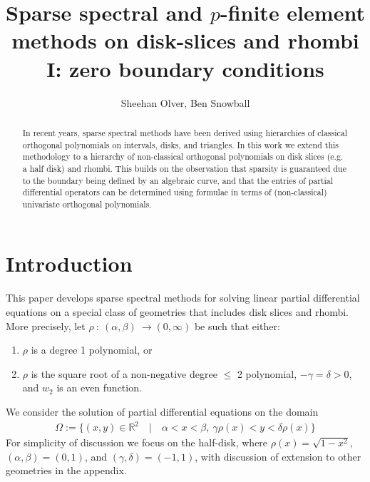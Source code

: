 \documentclass[11pt, oneside]{article}   	%
\title{Sparse spectral and $p$-finite element methods on disk-slices and rhombi I: zero boundary conditions}
\author{Sheehan Olver, Ben Snowball}
\newcommand{\R}{\mathbb{R}}
\begin{document}
\maketitle

\begin{abstract}
In recent years, sparse spectral methods have been derived using hierarchies of classical orthogonal polynomials on intervals, disks, and triangles. In this work we extend this methodology to a hierarchy of non-classical orthogonal polynomials on disk slices (e.g. a half disk) and rhombi. This builds on the observation that sparsity is guaranteed due to the boundary being defined by an algebraic curve, and that the entries of partial differential operators can be determined using formulae in terms of (non-classical) univariate orthogonal polynomials. 
\end{abstract}


%
\section{Introduction}

This paper develops sparse spectral methods for solving linear partial differential equations on a special class of geometries that includes disk slices and rhombi.  
More precisely, let  \(\rho \: : \: (\alpha,\beta) \: \to (0,\infty)\) be such that either:

\begin{enumerate}
\item  \(\rho\) is a degree 1 polynomial, or 
\item \(\rho\) is the square root of a non-negative degree \(\le\) 2 polynomial, \(-\gamma = \delta > 0\), and \(w_2\) is an even function.
\end{enumerate}

We consider the solution of partial differential equations on the domain
\begin{align}
\Omega := \{(x,y) \in \R^2 \quad | \quad \alpha < x < \beta, \: \gamma \rho(x) < y < \delta \rho(x)\}
\end{align}
For simplicity of discussion we focus on the half-disk, where $\rho(x) = \sqrt{1-x^2}$,  $(\alpha,\beta) = (0, 1)$, and  $(\gamma, \delta)  = (-1,1)$, with discussion of extension to other geometries in the appendix. 
\end{document}
